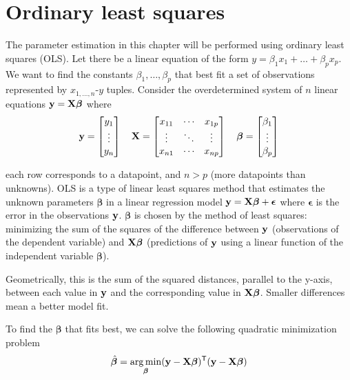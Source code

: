 \section{Ordinary least squares}

The parameter estimation in this chapter will be performed using ordinary least
squares (OLS). Let there be a linear equation of the form
$y = \beta_1 x_1 + \ldots + \beta_p x_p$. We want to find the constants
$\beta_1, \ldots, \beta_p$ that best fit a set of observations represented by
$x_{1,\ldots,n}$-$y$ tuples. Consider the overdetermined system of $n$ linear
equations
$\mathbf{y} = \mathbf{X}\bm{\beta}$ where
\begin{equation*}
  \mathbf{y} = \begin{bmatrix}
    y_1 \\
    \vdots \\
    y_n
  \end{bmatrix}
  \quad
  \mathbf{X} = \begin{bmatrix}
    x_{11} & \cdots & x_{1p} \\
    \vdots & \ddots & \vdots \\
    x_{n1} & \cdots & x_{np}
  \end{bmatrix}
  \quad
  \bm{\beta} = \begin{bmatrix}
    \beta_1 \\
    \vdots \\
    \beta_p
  \end{bmatrix}
\end{equation*}

each row corresponds to a datapoint, and $n > p$ (more datapoints than
unknowns). OLS is a type of linear least squares method that estimates the
unknown parameters $\bm{\beta}$ in a linear regression model
$\mathbf{y} = \mathbf{X}\bm{\beta} + \bm{\epsilon}$ where $\bm{\epsilon}$ is the error
in the observations $\mathbf{y}$. $\bm{\beta}$ is chosen by the method of least
squares: minimizing the sum of the squares of the difference between $\mathbf{y}$
(observations of the dependent variable) and $\mathbf{X}\bm{\beta}$ (predictions of
$\mathbf{y}$ using a linear function of the independent variable $\bm{\beta}$).

Geometrically, this is the sum of the squared distances, parallel to the y-axis,
between each value in $\mathbf{y}$ and the corresponding value in
$\mathbf{X}\bm{\beta}$. Smaller differences mean a better model fit.

To find the $\bm{\beta}$ that fits best, we can solve the following quadratic
minimization problem
\begin{equation*}
  \hat{\bm{\beta}} = \operatorname*{arg\,min}_{\bm{\beta}} (\mathbf{y} - \mathbf{X}\bm{\beta})^\mathsf{T}
    (\mathbf{y} - \mathbf{X}\bm{\beta})
\end{equation*}

